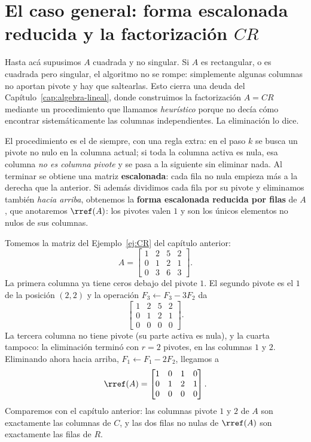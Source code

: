 \section{El caso general: forma escalonada reducida y la factorización $CR$}
\label{sec:caso-general}

Hasta acá supusimos $A$ cuadrada y no singular. Si $A$ es rectangular, o es
cuadrada pero singular, el algoritmo no se rompe: simplemente algunas columnas
no aportan pivote y hay que saltearlas. Esto cierra una deuda del
Capítulo~\ref{cap:algebra-lineal}, donde construimos la factorización $A=CR$
mediante un procedimiento que llamamos \emph{heurístico} porque no decía cómo
encontrar sistemáticamente las columnas independientes. La eliminación lo dice.

El procedimiento es el de siempre, con una regla extra: en el paso $k$ se busca
un pivote no nulo en la columna actual; si toda la columna activa es nula, esa
columna \emph{no es columna pivote} y se pasa a la siguiente sin eliminar nada.
Al terminar se obtiene una matriz \textbf{escalonada}: cada fila no nula empieza
más a la derecha que la anterior. Si además dividimos cada fila por su pivote y
eliminamos también \emph{hacia arriba}, obtenemos la \textbf{forma escalonada
reducida por filas} de $A$, que anotaremos $\rref(A)$: los pivotes valen $1$ y
son los únicos elementos no nulos de sus columnas.

\begin{example}\label{ej:rref-CR}
Tomemos la matriz del Ejemplo~\ref{ej:CR} del capítulo anterior:
\[
A = \begin{bmatrix}
    1 & 2 & 5 & 2 \\
    0 & 1 & 2 & 1 \\
    0 & 3 & 6 & 3
\end{bmatrix}.
\]
La primera columna ya tiene ceros debajo del pivote $1$. El segundo pivote es el
$1$ de la posición $(2,2)$ y la operación $F_3 \leftarrow F_3 - 3F_2$ da
\[
\begin{bmatrix}
    1 & 2 & 5 & 2 \\
    0 & 1 & 2 & 1 \\
    0 & 0 & 0 & 0
\end{bmatrix}.
\]
La tercera columna no tiene pivote (su parte activa es nula), y la cuarta
tampoco: la eliminación terminó con $r=2$ pivotes, en las columnas $1$ y $2$.
Eliminando ahora hacia arriba, $F_1 \leftarrow F_1 - 2F_2$, llegamos a
\[
\rref(A) =
\begin{bmatrix}
    1 & 0 & 1 & 0 \\
    0 & 1 & 2 & 1 \\
    0 & 0 & 0 & 0
\end{bmatrix}.
\]
Comparemos con el capítulo anterior: las columnas pivote $1$ y $2$ de $A$ son
exactamente las columnas de $C$, y las dos filas no nulas de $\rref(A)$ son
exactamente las filas de $R$.
\end{example}

